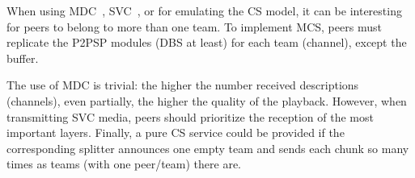 When using MDC~\cite{baccichet2007content}, SVC~\cite{chu2009auction},
or for emulating the CS model, it can be interesting for peers to
belong to more than one team. To implement MCS, peers must replicate
the P2PSP modules (DBS at least) for each team (channel), except the
buffer.

The use of MDC is trivial: the higher the number received descriptions
(channels), even partially, the higher the quality of the
playback. However, when transmitting SVC media, peers should
prioritize the reception of the most important layers. Finally, a
pure CS service could be provided if the corresponding splitter
announces one empty team and sends each chunk so many times as teams
(with one peer/team) there are.

